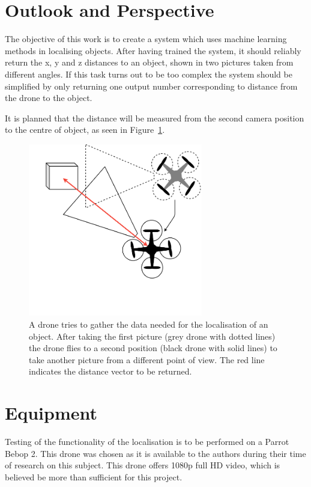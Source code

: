 \section{Outlook and Perspective}
The objective of this work is to create a system which uses machine learning methods in localising objects. After having trained the system, it should reliably return the x, y and z distances to an object, shown in two pictures taken from different angles. If this task turns out to be too complex the system should be simplified by only returning one output number corresponding to distance from the drone to the object.

It is planned that the distance will be measured from the second camera position to the centre of object, as seen in Figure~\ref{pic:introduction_outlookPerspective_pointsOfView}.

\begin{figure}[h]
	\centering
	\includegraphics[width=3in]{img/introduction_outlookPerspective_pointsOfView.png}
	\caption{A drone tries to gather the data needed for the localisation of an object. After taking the first picture (grey drone with dotted lines) the drone flies to a second position (black drone with solid lines) to take another picture from a different point of view. The red line indicates the distance vector to be returned.}
	\label{pic:introduction_outlookPerspective_pointsOfView}
\end{figure}

\section{Equipment}
Testing of the functionality of the localisation is to be performed on a Parrot Bebop 2. This drone was chosen as it is available to the authors during their time of research on this subject. This drone offers 1080p full HD video, which is believed be more than sufficient for this project.

